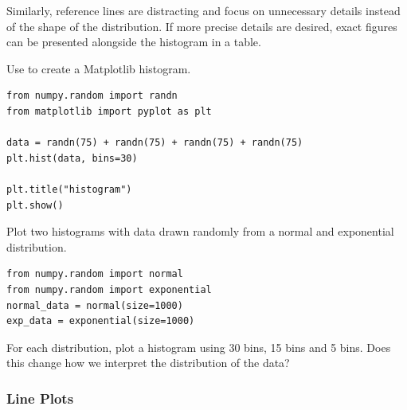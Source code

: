 Similarly, reference lines are distracting and focus on unnecessary details instead of the shape of the distribution.
If more precise details are desired, exact figures can be presented alongside the histogram in a table.

Use  to create a Matplotlib histogram.


\begin{lstlisting}
from numpy.random import randn
from matplotlib import pyplot as plt

data = randn(75) + randn(75) + randn(75) + randn(75)
plt.hist(data, bins=30)

plt.title("histogram")
plt.show()

\end{lstlisting}

\begin{problem} %
Plot two histograms with data drawn randomly from a normal and exponential distribution.

\begin{lstlisting}
from numpy.random import normal
from numpy.random import exponential
normal_data = normal(size=1000)
exp_data = exponential(size=1000)
\end{lstlisting}

For each distribution, plot a histogram using 30 bins, 15 bins and 5 bins.
Does this change how we interpret the distribution of the data?
\end{problem}

\subsubsection*{Line Plots} %

